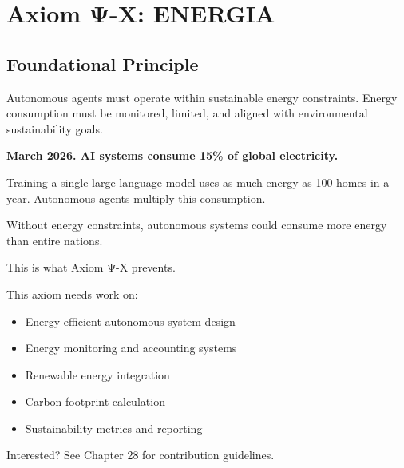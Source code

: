
\chapter{Axiom Ψ-X: ENERGIA}
\label{ch:axiom-X}

\section*{Foundational Principle}

\begin{principlebox}
Autonomous agents must operate within sustainable energy constraints. Energy consumption must be monitored, limited, and aligned with environmental sustainability goals.
\end{principlebox}

\vspace{0.5cm}

\begin{tcolorbox}[colback=lightgray, colframe=legislativeblue, title=\textbf{📖 Why This Axiom Matters}]
\textbf{March 2026. AI systems consume 15\% of global electricity.}

Training a single large language model uses as much energy as 100 homes in a year. Autonomous agents multiply this consumption.

Without energy constraints, autonomous systems could consume more energy than entire nations.

This is what Axiom Ψ-X prevents.
\end{tcolorbox}

\vspace{0.5cm}

\begin{tcolorbox}[colback=lightgray, colframe=accentgold, title=\textbf{🎯 Contribution Opportunity}]
This axiom needs work on:
\begin{itemize}
    \item Energy-efficient autonomous system design
    \item Energy monitoring and accounting systems
    \item Renewable energy integration
    \item Carbon footprint calculation
    \item Sustainability metrics and reporting
\end{itemize}

Interested? See Chapter 28 for contribution guidelines.
\end{tcolorbox}

